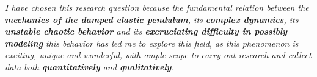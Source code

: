 \textit{I have chosen this research question because the fundamental relation between the \textbf{mechanics of the damped elastic pendulum}, its \textbf{complex dynamics}, its \textbf{unstable chaotic behavior} and its \textbf{excruciating difficulty in possibly modeling} this behavior has led me to explore this field, as this phenomenon is exciting, unique and wonderful, with ample scope to carry out research and collect data both \textbf{quantitatively} and \textbf{qualitatively}.}

